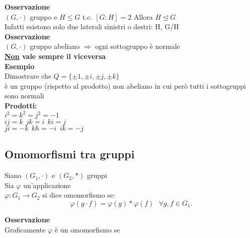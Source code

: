 \documentclass[12px]{article}
\begin{document}
	 \textbf{Osservazione}\\
	 $(G,\cdot)$ gruppo e $H\leq G$ t.c.  $[G:H] = 2$ Allora  $H\trianglelefteq G$\\
	 Infatti esistono solo due laterali sinistri o destri: H, G/H\\
	 \textbf{Osservazione}\\
	 $(G,\cdot)$ gruppo abeliano $\Rightarrow$ ogni sottogruppo è normale\\
	 \textbf{\underline{Non} vale sempre il viceversa}\\
	 \textbf{Esempio}\\
	 Dimostrare che $Q = \lbrace \pm 1, \pm i,\pm j,\pm k\rbrace$\\ 
	 è un gruppo (rispetto al prodotto)
	 non abeliano in cui però tutti i sottogruppi sono normali\\
	  \textbf{Prodotti:}\\
	  $i^2 = k^2 = j^2 = -1$\\
	   $ij = k \ \ jk = i \ \ ki = j$\\
	    $ji = -k \ \ kh = -i \ \ ik = -j$

	   \subsection{Omomorfismi tra gruppi}
	 \begin{defi}
		Siano $(G_1,\cdot)$ e $(G_2,*)$ gruppi\\
		Sia $ \varphi$ un'applicazione\\
		$
		\varphi: G_1  \rightarrow G_2$ si dice omomorfismo se:
		\[
		\varphi(g\cdot f) = \varphi(g)* \varphi(f) \ \ \ \forall g,f\in G_1
		.\] 
		
	\end{defi}
	\textbf{Osservazione}\\
	Graficamente $ \varphi$ è un omomorfismo se
	
\end{document}
